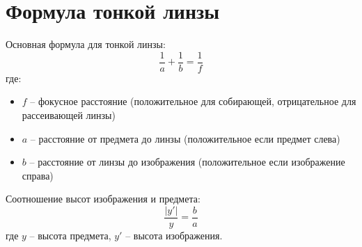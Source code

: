 \documentclass{article}
\begin{document}
\section*{Формула тонкой линзы}

Основная формула для тонкой линзы:
\[
\frac{1}{a}+\frac{1}{b}=\frac{1}{f}
\]
где:
\begin{itemize}
\item $f$ -- фокусное расстояние (положительное для собирающей, отрицательное для рассеивающей линзы)
\item $a$ -- расстояние от предмета до линзы (положительное если предмет слева)
\item $b$ -- расстояние от линзы до изображения (положительное если изображение справа)
\end{itemize}

Соотношение высот изображения и предмета:
\[
\frac{|y'|}{y}=\frac{b}{a}
\]
где $y$ -- высота предмета, $y'$ -- высота изображения.
\end{document}
